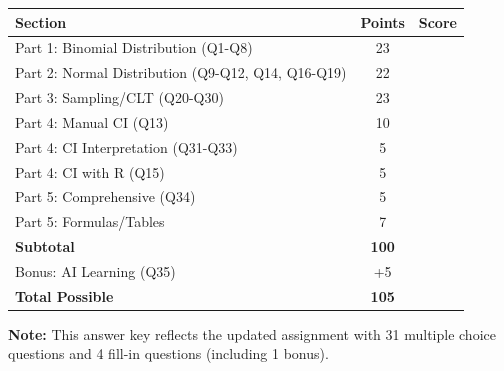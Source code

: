 \documentclass[11pt]{article}
\begin{document}
\begin{table}[h]
\centering
\begin{tabular}{lcc}
\toprule
\textbf{Section} & \textbf{Points} & \textbf{Score} \\
\midrule
Part 1: Binomial Distribution (Q1-Q8) & 23 & \\
Part 2: Normal Distribution (Q9-Q12, Q14, Q16-Q19) & 22 & \\
Part 3: Sampling/CLT (Q20-Q30) & 23 & \\
Part 4: Manual CI (Q13) & 10 & \\
Part 4: CI Interpretation (Q31-Q33) & 5 & \\
Part 4: CI with R (Q15) & 5 & \\
Part 5: Comprehensive (Q34) & 5 & \\
Part 5: Formulas/Tables & 7 & \\
\midrule
\textbf{Subtotal} & \textbf{100} & \\
Bonus: AI Learning (Q35) & +5 & \\
\midrule
\textbf{Total Possible} & \textbf{105} & \\
\bottomrule
\end{tabular}
\end{table}

\textbf{Note:} This answer key reflects the updated assignment with 31 multiple choice questions and 4 fill-in questions (including 1 bonus).
\end{document}
